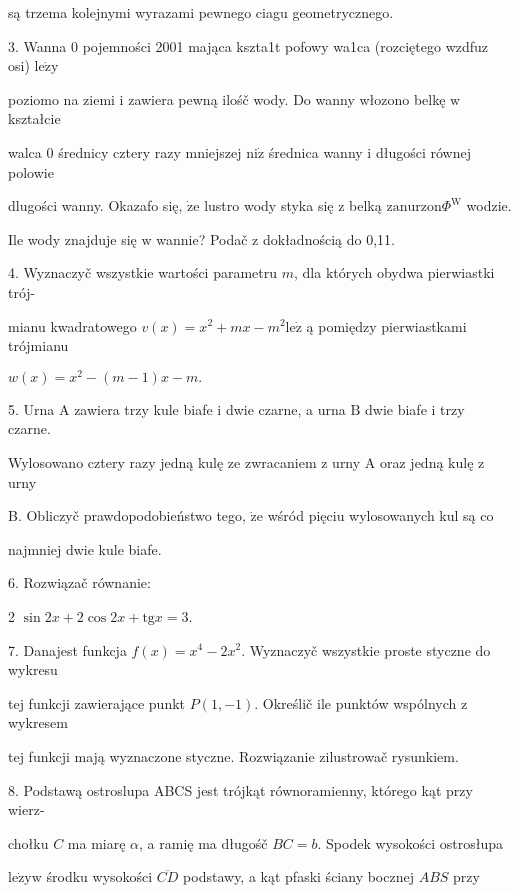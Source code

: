 \documentclass[a4paper,12pt]{article}
\begin{document}
są trzema kolejnymi wyrazami pewnego ciagu geometrycznego.

3. Wanna $0$ pojemności 2001 mająca kszta1t pofowy wa1ca (rozciętego wzdfuz osi) $\mathrm{l}\mathrm{e}\dot{\mathrm{z}}\mathrm{y}$

poziomo na ziemi $\mathrm{i}$ zawiera pewną ilośč wody. Do wanny włozono belkę $\mathrm{w}$ kształcie

walca $0$ średnicy cztery razy mniejszej $\mathrm{n}\mathrm{i}\dot{\mathrm{z}}$ średnica wanny $\mathrm{i}$ długości równej polowie

dlugości wanny. Okazafo się, $\dot{\mathrm{z}}\mathrm{e}$ lustro wody styka się $\mathrm{z}$ belką $\mathrm{z}\mathrm{a}\mathrm{n}\mathrm{u}\mathrm{r}\mathrm{z}\mathrm{o}\mathrm{n}\Phi^{\mathrm{W}}$ wodzie.

Ile wody znajduje się $\mathrm{w}$ wannie? Podač $\mathrm{z}$ dokładnością do 0,11.

4. Wyznaczyč wszystkie wartości parametru $m$, dla których obydwa pierwiastki trój-

mianu kwadratowego $v(x)=x^{2}+mx-m^{2}\mathrm{l}\mathrm{e}\dot{\mathrm{z}}$ ą pomiędzy pierwiastkami trójmianu

$w(x)=x^{2}-(m-1)x-m.$

5. Urna A zawiera trzy kule biafe $\mathrm{i}$ dwie czarne, a urna $\mathrm{B}$ dwie biafe $\mathrm{i}$ trzy czarne.

Wylosowano cztery razy jedną kulę ze zwracaniem $\mathrm{z}$ urny A oraz jedną kulę $\mathrm{z}$ urny

B. Obliczyč prawdopodobieństwo tego, $\dot{\mathrm{z}}\mathrm{e}$ wśród pięciu wylosowanych kul są co

najmniej dwie kule biafe.

6. Rozwiązač równanie:

2 $\sin 2x+2\cos 2x+\mathrm{t}\mathrm{g}x=3.$

7. Danajest funkcja $f(x)=x^{4}-2x^{2}$. Wyznaczyč wszystkie proste styczne do wykresu

tej funkcji zawierające punkt $P(1,-1)$. Określič ile punktów wspólnych $\mathrm{z}$ wykresem

tej funkcji mają wyznaczone styczne. Rozwiązanie zilustrowač rysunkiem.

8. Podstawą ostroslupa ABCS jest trójkąt równoramienny, którego kąt przy wierz-

chołku $C$ ma miarę $\alpha$, a ramię ma długośč $BC=b$. Spodek wysokości ostrosłupa

$\mathrm{l}\mathrm{e}\dot{\mathrm{z}}\mathrm{y}\mathrm{w}$ środku wysokości $\overline{CD}$ podstawy, a kąt pfaski ściany bocznej $ABS$ przy
\end{document}

